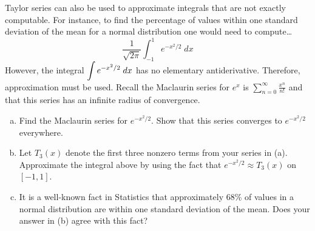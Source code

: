 \documentclass[11pt,letterpaper]{article}
\begin{document}
\newpage



 Taylor series can also be used to approximate integrals that are not exactly computable. For instance, to find the percentage of values within one standard deviation of the mean for a normal distribution one would need to compute\dots
	\[
	\dfrac{1}{\sqrt{2\pi}} \int_{-1}^1 e^{-x^2/2} \;dx
	\]
However, the integral $\displaystyle \int e^{-x^2/2} \; dx$ has no elementary antiderivative. Therefore, approximation must be used. Recall the Maclaurin series for $e^x$ is $\sum_{n=0}^\infty \frac{x^n}{n!}$ and that this series has an infinite radius of convergence. 
	\begin{enumerate}[(a)]
	\item Find the Maclaurin series for $e^{-x^2/2}$. Show that this series converges to $e^{-x^2/2}$ everywhere. 
	\item Let $T_3(x)$ denote the first three nonzero terms from your series in (a). Approximate the integral above by using the fact that $e^{-x^2/2} \approx T_3(x)$ on $[-1, 1]$. 
	\item It is a well-known fact in Statistics that approximately 68\% of values in a normal distribution are within one standard deviation of the mean. Does your answer in (b) agree with this fact? 
	\end{enumerate}
\end{document}
